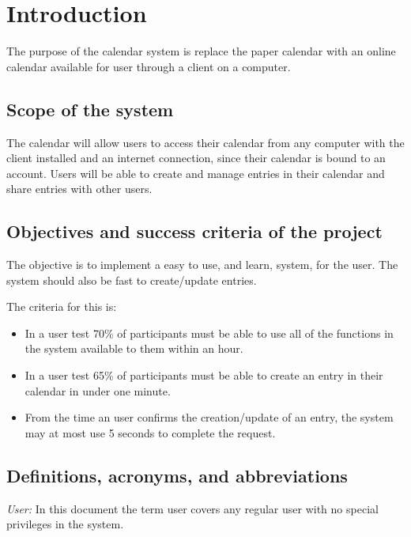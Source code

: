 \section{Introduction}
The purpose of the calendar system is replace the paper calendar with an online calendar available for user through a client on a computer. 
\subsection{Scope of the system}
The calendar will allow users to access their calendar from any computer with the client installed and an internet connection, since their calendar is bound to an account. Users will be able to create and manage entries in their calendar and share entries with other users.
\subsection{Objectives and success criteria of the project}
The objective is to implement a easy to use, and learn, system, for the user. The system should also be fast to create/update entries.

The criteria for this is:
\begin{itemize}
\item In a user test 70\% of participants must be able to use all of the functions in the system available to them within an hour.
\item In a user test 65\% of participants must be able to create an entry in their calendar in under one minute.
\item From the time an user confirms the creation/update of an entry, the system may at most use 5 seconds to complete the request.
\end{itemize}
\subsection{Definitions, acronyms, and abbreviations}
\textit{User:} In this document the term user covers any regular user with no special privileges in the system.
